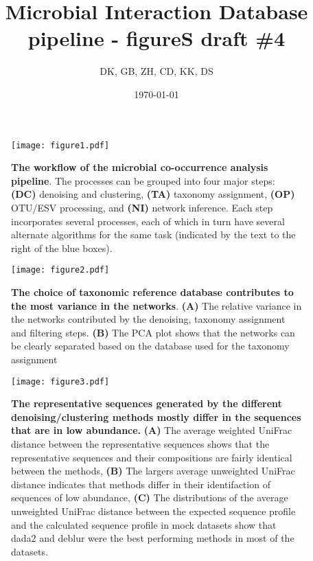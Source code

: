 




\title{ \huge Microbial Interaction Database pipeline - figureS draft \#4 }
\author{DK, GB, ZH, CD, KK, DS}
\date{\today}



\maketitle

\begin{figure}[h]
  \centering
  \texttt{[image: figure1.pdf]}
  \caption{
    \textbf{The workflow of the microbial co-occurrence analysis pipeline}.
    The processes can be grouped into four major steps: \textbf{(DC)} denoising and clustering, \textbf{(TA)} taxonomy assignment, \textbf{(OP)} OTU/ESV processing, and \textbf{(NI)} network inference.
    Each step incorporates several processes, each of which in turn have several alternate algorithms for the same task (indicated by the text to the right of the blue boxes).
  }
  \label{fig:figure1}
\end{figure}

\begin{figure}[h]
  \centering
  \texttt{[image: figure2.pdf]}
  \caption{
    \textbf{The choice of taxonomic reference database contributes to the most variance in the networks}.
    \textbf{(A)} The relative variance in the networks contributed by the denoising, taxonomy assignment and filtering steps.
    \textbf{(B)} The PCA plot shows that the networks can be clearly separated based on the database used for the taxonomy assignment
  }
  \label{fig:figure2}
\end{figure}

\begin{figure}[h]
  \centering
  \texttt{[image: figure3.pdf]}
  \caption{
    \textbf{The representative sequences generated by the different denoising/clustering methods mostly differ in the sequences that are in low abundance.}
    \textbf{(A)} The average weighted UniFrac distance between the representative sequences shows that the representative sequences and their compositions are fairly identical between the methods,
    \textbf{(B)} The largers average unweighted UniFrac distance indicates that methods differ in their identifaction of sequences of low abundance,
    \textbf{(C)} The distributions of the average unweighted UniFrac distance between the expected sequence profile and the calculated sequence profile in mock datasets show that dada2 and deblur were the best performing methods in most of the datasets.
  }
  \label{fig:figure3}
\end{figure}

